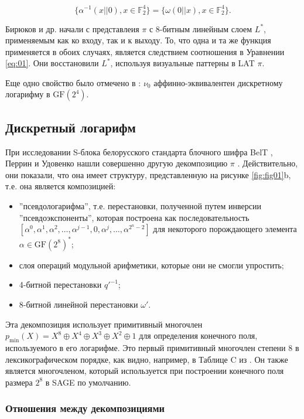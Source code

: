 \begin{equation}
\{\alpha^{-1}(x||0), x \in \mathbb{F}_2^4\} = \{\omega(0||x), x \in \mathbb{F}_2^4\}.
\label{eq:01}
\end{equation}

Бирюков и др. начали с представлеия \(\pi\) с 8-битным линейным слоем \(L^*\), применяемым как ко входу, так и к выходу. То, что одна и та же функция применяется в обоих случаях, является следствием соотношения в Уравнении \eqref{eq:01}. Они восстановили \(L^*\), используя визуальные паттерны в LAT \(\pi\).

Еще одно свойство было отмечено в \cite{PU16}: \(\nu_0\) аффинно-эквивалентен дискретному логарифму в \(\text{GF}(2^4)\).

\subsection{Дискретный логарифм}

При исследовании S-блока белорусского стандарта блочного шифра BelT \cite{Bel11}, Перрин и Удовенко нашли совершенно другую декомпозицию \(\pi\) \cite{PU16}. Действительно, они показали, что она имеет структуру, представленную на рисунке \ref{fig:fig01}b, т.е. она является композицией:

\begin{itemize}
    \item ''псевдологарифма'', т.е. перестановки, полученной путем инверсии ''псевдоэкспоненты'', которая построена как последовательность \([\alpha^0, \alpha^1, \alpha^2, \ldots, \alpha^{j-1}, 0, \alpha^j, \ldots, \alpha^{2^n-2}]\) для некоторого порождающего элемента \(\alpha \in \text{GF}(2^8)^*\);
    \item слоя операций модульной арифметики, которые они не смогли упростить;
    \item 4-битной перестановки \(q'^{-1}\);
    \item 8-битной линейной перестановки \(\omega'\).
\end{itemize}

Эта декомпозиция использует примитивный многочлен \(p_{\text{min}}(X) = X^8 \oplus X^4 \oplus X^3 \oplus X^2 \oplus 1\) для определения конечного поля, используемого в его логарифме. Это первый примитивный многочлен степени 8 в лексикографическом порядке, как видно, например, в Таблице C из \cite{LN97}. Он также является многочленом, который используется при построении конечного поля размера \(2^8\) в SAGE \cite{Dev17} по умолчанию.

\subsubsection{Отношения между декомпозициями}

